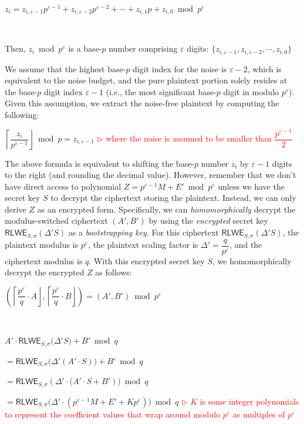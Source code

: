 $z_i = z_{i, \varepsilon-1}p^{\varepsilon-1} + z_{i, \varepsilon-2}p^{\varepsilon-2} + \cdots + z_{i,1}p + z_{i,0} \bmod p^\varepsilon$

$ $

Then, $z_i \bmod p^\varepsilon$ is a base-$p$ number comprising $\varepsilon$ digits: $\{z_{i,\varepsilon-1}, z_{i,\varepsilon-2}, \cdots, z_{i,0}\}$


We assume that the highest base-$p$ digit index for the noise is $\varepsilon-2$, which is equivalent to the noise budget, and the pure plaintext portion solely resides at the base-$p$ digit index $\varepsilon-1$ (i.e., the most significant base-$p$ digit in modulo $p^\varepsilon$). Given this assumption, we extract the noise-free plaintext by computing the following:

$\left\lceil \dfrac{z_i}{p^{\varepsilon-1}} \right\rfloor \bmod p = z_{i,\varepsilon-1}$ \textcolor{red}{ $\rhd$ where the noise is assumed to be smaller than $\dfrac{p^{\varepsilon-1}}{2}$}

The above formula is equivalent to shifting the base-$p$ number $z_i$ by $\varepsilon-1$ digits to the right (and rounding the decimal value). However, remember that we don't have direct access to polynomial $Z = p^{\varepsilon-1}M + E' \bmod p^\varepsilon$ unless we have the secret key $S$ to decrypt the ciphertext storing the plaintext. Instead, we can only derive $Z$ as an encrypted form. Specifically, we can \textit{homomorphically} decrypt the modulus-switched ciphertext $(A', B')$ by using the \textit{encrypted} secret key $\textsf{RLWE}_{S, \sigma}(\Delta' S)$ as a \textit{bootstrapping key}. For this ciphertext $\textsf{RLWE}_{S, \sigma}(\Delta' S)$, the plaintext modulus is $p^\varepsilon$, the plaintext scaling factor is $\Delta' = \dfrac{q}{p^\varepsilon}$, and the ciphertext modulus is $q$. With this encrypted secret key $S$, we homomorphically decrypt the encrypted $Z$ as follows: 


$\left(\left\lceil \dfrac{p^\varepsilon}{q}\cdot A\right\rfloor, \left\lceil \dfrac{p^\varepsilon}{q}\cdot B\right\rfloor\right) = (A', B') \bmod p^\varepsilon$ 

$ $

$A' \cdot \textsf{RLWE}_{S, \sigma}\bm(\Delta' S\bm) + B' \bmod q$


$= \textsf{RLWE}_{S, \sigma}\bm(\Delta' (A' \cdot S)\bm) + B' \bmod q$

$= \textsf{RLWE}_{S, \sigma}(\Delta' \cdot \bm(A'\cdot S + B')\bm) \bmod q$

$ = \textsf{RLWE}_{S, \sigma}\bm(\Delta' \cdot (p^{\varepsilon-1} M  + E' + Kp^\varepsilon)\bm) \bmod q$ \textcolor{red}{ $\rhd$ $K$ is some integer polynomials to represent the coefficient values that wrap around modulo $p^\varepsilon$ as multiples of $p^\varepsilon$}

